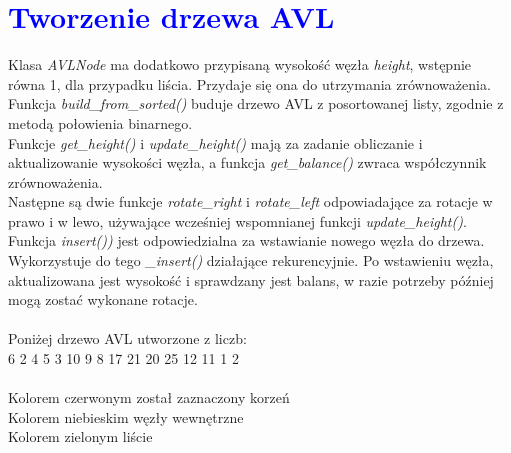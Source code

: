 \documentclass{article}
\begin{document}
	\section*{\textcolor{blue}{Tworzenie drzewa AVL}}
	\begin{multicols}{2}
		\noindent Klasa \textit{AVLNode} ma dodatkowo przypisaną wysokość węzła \textit{height}, wstępnie równa 1, dla przypadku liścia. Przydaje się ona do utrzymania zrównoważenia. \\Funkcja \textit{build\_from\_sorted()} buduje drzewo AVL z posortowanej listy, zgodnie z metodą połowienia binarnego. \\Funkcje \textit{get\_height()} i \textit{update\_height()} mają za zadanie obliczanie i aktualizowanie wysokości węzła, a funkcja \textit{get\_balance()} zwraca współczynnik zrównoważenia. \\Następne są dwie funkcje \textit{rotate\_right} i \textit{rotate\_left} odpowiadające za rotacje w prawo i w lewo, używające wcześniej wspomnianej funkcji \textit{update\_height()}. Funkcja \textit{insert())} jest odpowiedzialna za wstawianie nowego węzła do drzewa. Wykorzystuje do tego \textit{\_insert()} działające rekurencyjnie. Po wstawieniu węzła, aktualizowana jest wysokość i sprawdzany jest balans, w razie potrzeby później mogą zostać wykonane rotacje.\\ \\
		\noindent Poniżej drzewo AVL utworzone z liczb: \\6 2 4 5 3 10 9 8 17 21 20 25 12 11 1 2 \\ \\ 
		\noindent Kolorem czerwonym został zaznaczony korzeń \\
		Kolorem niebieskim węzły wewnętrzne \\
		Kolorem zielonym liście
			
			
		
		\noindent 
		

\end{multicols}
\end{document}
